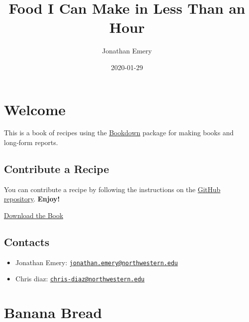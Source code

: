 \documentclass[openany]{book}
\title{Food I Can Make in Less Than an Hour}
\author{Jonathan Emery}
\date{2020-01-29}
\providecommand{\tightlist}{%
  \setlength{\itemsep}{0pt}\setlength{\parskip}{0pt}}
\begin{document}
\maketitle

{
\setcounter{tocdepth}{1}
\tableofcontents
}
\chapter*{Welcome}\label{welcome}

This is a book of recipes using the
\href{https://bookdown.org/}{Bookdown} package for making books and
long-form reports.

\section*{Contribute a Recipe}\label{contribute-a-recipe}

You can contribute a recipe by following the instructions on the
\href{https://github.com/chrisdaaz/recipe-bookdown}{GitHub repository}.
\textbf{Enjoy!}

\href{./recipe-bookdown.pdf}{Download the Book}

\section*{Contacts}\label{contacts}

\begin{itemize}
\tightlist
\item
  Jonathan Emery:
  \href{mailto:jonathan.emery@northwestern.edu}{\nolinkurl{jonathan.emery@northwestern.edu}}
\item
  Chris diaz:
  \href{mailto:chris-diaz@northwestern.edu}{\nolinkurl{chris-diaz@northwestern.edu}}
\end{itemize}

\chapter{Banana Bread}\label{banana-bread}
\end{document}
